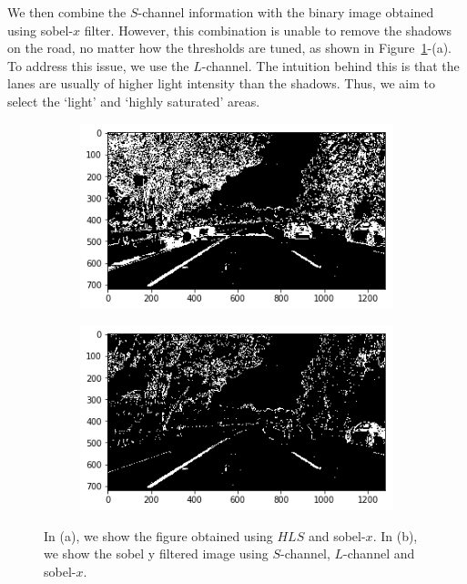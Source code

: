 \documentclass[draftcls,onecolumn,12pt]{IEEEtran}
\theoremstyle{plain}
\theoremstyle{plain}
\begin{document}
We then combine the $S$-channel information with the binary image obtained using sobel-$x$ filter. However, this combination is unable to remove the shadows on the road, no matter how the thresholds are tuned, as shown in Figure~\ref{Fig:FilterFinal}-(a). To address this issue, we use the $L$-channel. The intuition behind this is that the lanes are usually of higher light intensity than the shadows. Thus, we aim to select the `light' and `highly saturated' areas.

\begin{figure}[htb!!]
    \centering
   \begin{subfigure}[t]{0.45\textwidth}
        \includegraphics[width=\textwidth]{./figures/color_gradient.png}\\
        \caption{}
    \end{subfigure}
    \hspace{-0.5cm}
    \begin{subfigure}[t]{0.45\textwidth}
        \includegraphics[width=\textwidth]{./figures/color_gradient_light.png}\\
        \caption{}
    \end{subfigure}
    \caption{In (a), we show the figure obtained using $HLS$ and sobel-$x.$ In (b), we show the sobel y filtered image using $S$-channel, $L$-channel and sobel-$x.$}\label{Fig:FilterFinal}
\end{figure}
\end{document}
